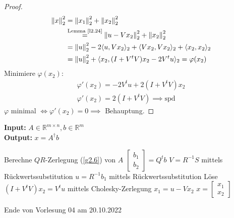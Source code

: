 \documentclass{book}
\def\R{\mathbb{R}}
\begin{document}
            \begin{proof}
                \begin{align*}
                    \left\Vert x \right\Vert_2^2 &= \left\Vert x_1 \right\Vert_2^2 + \left\Vert x_2 \right\Vert_2^2\\
                    &\stackrel{\text{Lemma \ref{l2.24}}}{=}\left\Vert u-Vx_2 \right\Vert_2^2+ \left\Vert x_2 \right\Vert_2^2\\
                    &=\left\Vert u \right\Vert_2^2-2 \langle u,Vx_2 \rangle_2+\langle Vx_2,Vx_2 \rangle_2+\langle x_2,x_2 \rangle_2\\
                    &=\left\Vert u \right\Vert_2^2+\langle x_2,(I+V^tV)x_2-2V^tu \rangle_2 = \varphi(x_2)
                \end{align*}
                Minimiere $\varphi(x_2)$:
                \begin{align*}
                    \varphi'(x_2)=-2V^tu+2(I+V^tV)x_2\\
                    \varphi'(x_2)=2(I+V^tV) \implies \text{spd}
                \end{align*}
                $\varphi$ minimal $\iff \varphi'(x_2)=0\implies $ Behauptung.
            \end{proof}

            \begin{algorithm}[H]\label{a2.26}
                \caption{}
                \textbf{Input:} $A\in\R^{m\times n},b\in\R^m$\\
                \textbf{Output:} $x=A^\dagger b$
                \begin{algorithmic}
                \State Berechne $QR$-Zerlegung (\ref{g2.6}) von $A$
                \State $\begin{bmatrix}b_1\\b_2\end{bmatrix}=Q^t b$
                \State $V=R^{-1}S$ mittels Rückwertssubstitution 
                \State $u=R^{-1}b_1$ mittels Rückwertssubstitution
                \State Löse $(I+V^tV)x_2=V^tu$ mittels Cholesky-Zerlegung 
                \State $x_1=u-Vx_2$
                \State $x=\begin{bmatrix}x_1\\x_2\end{bmatrix}$
                \end{algorithmic}
            \end{algorithm}

            \noindent
            \xrfill[0.7ex]{1pt}Ende von Vorlesung 04 am 20.10.2022\xrfill[0.7ex]{1pt}
            
\end{document}
